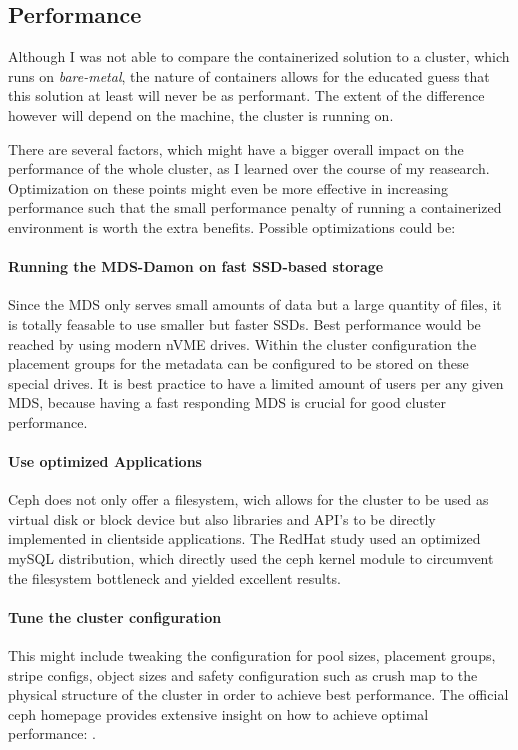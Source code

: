 \documentclass[titlepage, a4paper, 11pt]{scrartcl}
\begin{document}
        \subsection{Performance}\label{performance:tuning}

            Although I was not able to compare the containerized solution to a cluster, which runs on \textit{bare-metal}, 
            the nature of containers allows for the educated guess that this solution at least will never be as performant. The extent of the difference however will depend on the machine, the cluster is running on. 

            There are several factors, which might have a bigger overall impact on the performance of the whole cluster, as I learned over the course of my reasearch. Optimization on these points might even be more effective in increasing performance such that the small performance penalty of running a containerized environment is worth the extra benefits. Possible optimizations could be:

            \paragraph{Running the MDS-Damon on fast SSD-based storage} Since the MDS only serves small amounts of data but a large quantity of files, it is totally feasable to use smaller but faster SSDs. Best performance would be reached by using modern nVME drives. Within the cluster configuration the placement groups for the metadata can be configured to be stored on these special drives. It is best practice to have a limited amount of users per any given MDS, because having a fast responding MDS is crucial for good cluster performance.
        

            \paragraph{Use optimized Applications} Ceph does not only offer a filesystem, wich allows for the cluster to be used as virtual disk or block device but also libraries and API's to be directly implemented in clientside applications. The RedHat study\cite{redhatstudy} used an optimized mySQL distribution, which directly used the ceph kernel module to circumvent the filesystem bottleneck and yielded excellent results.

            \paragraph{Tune the cluster configuration} This might include tweaking the configuration for pool sizes, placement groups, stripe configs, object sizes and safety configuration such as crush map to the physical structure of the cluster in order to achieve best performance. The official ceph homepage provides extensive insight on how to achieve optimal performance: \cite{CephMakingCephFaster}.
\end{document}

